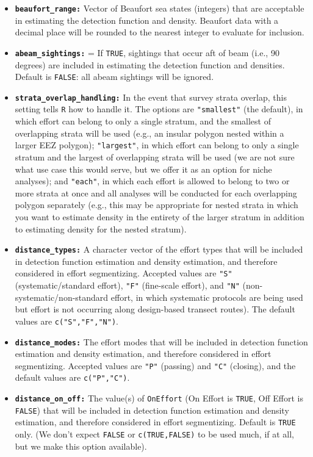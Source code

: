 \documentclass[
]{book}
\begin{document}
\begin{itemize}
\item
  \textbf{\texttt{beaufort\_range:}} Vector of Beaufort sea states (integers) that are acceptable in estimating the detection function and density. Beaufort data with a decimal place will be rounded to the nearest integer to evaluate for inclusion.
\item
  \textbf{\texttt{abeam\_sightings:}} = If \texttt{TRUE}, sightings that occur aft of beam (i.e., 90 degrees) are included in estimating the detection function and densities. Default is \texttt{FALSE}: all abeam sightings will be ignored.
\item
  \textbf{\texttt{strata\_overlap\_handling:}} In the event that survey strata overlap, this setting tells \texttt{R} how to handle it. The options are \texttt{"smallest"} (the default), in which effort can belong to only a single stratum, and the smallest of overlapping strata will be used (e.g., an insular polygon nested within a larger EEZ polygon); \texttt{"largest"}, in which effort can belong to only a single stratum and the largest of overlapping strata will be used (we are not sure what use case this would serve, but we offer it as an option for niche analyses); and \texttt{"each"}, in which each effort is allowed to belong to two or more strata at once and all analyses will be conducted for each overlapping polygon separately (e.g., this may be appropriate for nested strata in which you want to estimate density in the entirety of the larger stratum in addition to estimating density for the nested stratum).
\item
  \textbf{\texttt{distance\_types:}} A character vector of the effort types that will be included in detection function estimation and density estimation, and therefore considered in effort segmentizing. Accepted values are \texttt{"S"} (systematic/standard effort), \texttt{"F"} (fine-scale effort), and \texttt{"N"} (non-systematic/non-standard effort, in which systematic protocols are being used but effort is not occurring along design-based transect routes). The default values are \texttt{c("S","F","N")}.
\item
  \textbf{\texttt{distance\_modes:}} The effort modes that will be included in detection function estimation and density estimation, and therefore considered in effort segmentizing. Accepted values are \texttt{"P"} (passing) and \texttt{"C"} (closing), and the default values are \texttt{c("P","C")}.
\item
  \textbf{\texttt{distance\_on\_off:}} The value(s) of \texttt{OnEffort} (On Effort is \texttt{TRUE}, Off Effort is \texttt{FALSE}) that will be included in detection function estimation and density estimation, and therefore considered in effort segmentizing. Default is \texttt{TRUE} only. (We don't expect \texttt{FALSE} or \texttt{c(TRUE,FALSE)} to be used much, if at all, but we make this option available).
\end{itemize}
\end{document}
